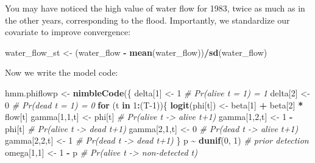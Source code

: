 \documentclass[
  12pt,
]{krantz}
\newenvironment{Shaded}{\begin{snugshade}}{\end{snugshade}}
\newcommand{\CommentTok}[1]{\textcolor[rgb]{0.56,0.35,0.01}{\textit{#1}}}
\newcommand{\ControlFlowTok}[1]{\textcolor[rgb]{0.13,0.29,0.53}{\textbf{#1}}}
\newcommand{\DecValTok}[1]{\textcolor[rgb]{0.00,0.00,0.81}{#1}}
\newcommand{\FunctionTok}[1]{\textcolor[rgb]{0.13,0.29,0.53}{\textbf{#1}}}
\newcommand{\NormalTok}[1]{#1}
\newcommand{\OtherTok}[1]{\textcolor[rgb]{0.56,0.35,0.01}{#1}}
\newcommand{\SpecialCharTok}[1]{\textcolor[rgb]{0.81,0.36,0.00}{\textbf{#1}}}
\begin{document}
You may have noticed the high value of water flow for 1983, twice as much as in the other years, corresponding to the flood. Importantly, we standardize our covariate to improve convergence:

\begin{Shaded}
\begin{Highlighting}[]
\NormalTok{water\_flow\_st }\OtherTok{\textless{}{-}}\NormalTok{ (water\_flow }\SpecialCharTok{{-}} \FunctionTok{mean}\NormalTok{(water\_flow))}\SpecialCharTok{/}\FunctionTok{sd}\NormalTok{(water\_flow)}
\end{Highlighting}
\end{Shaded}

Now we write the model code:

\begin{Shaded}
\begin{Highlighting}[]
\NormalTok{hmm.phiflowp }\OtherTok{\textless{}{-}} \FunctionTok{nimbleCode}\NormalTok{(\{}
\NormalTok{  delta[}\DecValTok{1}\NormalTok{] }\OtherTok{\textless{}{-}} \DecValTok{1}                 \CommentTok{\# Pr(alive t = 1) = 1}
\NormalTok{  delta[}\DecValTok{2}\NormalTok{] }\OtherTok{\textless{}{-}} \DecValTok{0}                 \CommentTok{\# Pr(dead t = 1) = 0}
  \ControlFlowTok{for}\NormalTok{ (t }\ControlFlowTok{in} \DecValTok{1}\SpecialCharTok{:}\NormalTok{(T}\DecValTok{{-}1}\NormalTok{))\{}
    \FunctionTok{logit}\NormalTok{(phi[t]) }\OtherTok{\textless{}{-}}\NormalTok{ beta[}\DecValTok{1}\NormalTok{] }\SpecialCharTok{+}\NormalTok{ beta[}\DecValTok{2}\NormalTok{] }\SpecialCharTok{*}\NormalTok{ flow[t] }
\NormalTok{    gamma[}\DecValTok{1}\NormalTok{,}\DecValTok{1}\NormalTok{,t] }\OtherTok{\textless{}{-}}\NormalTok{ phi[t]      }\CommentTok{\# Pr(alive t {-}\textgreater{} alive t+1)}
\NormalTok{    gamma[}\DecValTok{1}\NormalTok{,}\DecValTok{2}\NormalTok{,t] }\OtherTok{\textless{}{-}} \DecValTok{1} \SpecialCharTok{{-}}\NormalTok{ phi[t]  }\CommentTok{\# Pr(alive t {-}\textgreater{} dead t+1)}
\NormalTok{    gamma[}\DecValTok{2}\NormalTok{,}\DecValTok{1}\NormalTok{,t] }\OtherTok{\textless{}{-}} \DecValTok{0}           \CommentTok{\# Pr(dead t {-}\textgreater{} alive t+1)}
\NormalTok{    gamma[}\DecValTok{2}\NormalTok{,}\DecValTok{2}\NormalTok{,t] }\OtherTok{\textless{}{-}} \DecValTok{1}           \CommentTok{\# Pr(dead t {-}\textgreater{} dead t+1)}
\NormalTok{  \}}
\NormalTok{  p }\SpecialCharTok{\textasciitilde{}} \FunctionTok{dunif}\NormalTok{(}\DecValTok{0}\NormalTok{, }\DecValTok{1}\NormalTok{)               }\CommentTok{\# prior detection}
\NormalTok{  omega[}\DecValTok{1}\NormalTok{,}\DecValTok{1}\NormalTok{] }\OtherTok{\textless{}{-}} \DecValTok{1} \SpecialCharTok{{-}}\NormalTok{ p           }\CommentTok{\# Pr(alive t {-}\textgreater{} non{-}detected t)}

\end{Highlighting}
\end{Shaded}
\end{document}
